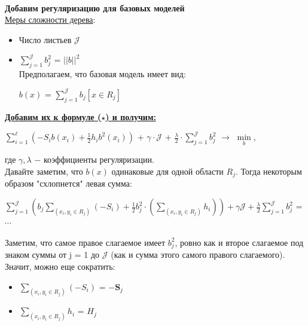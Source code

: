         \\

        
        \textbf{Добавим регуляризацию для базовых моделей}\\

        \underline{Меры сложности дерева}:
        \begin{itemize}
            \item Число листьев $\mathcal{J}$

            \item $\sum\limits_{j = 1}^\mathcal{J}b_j^2$ = $||b||^2$\\

                Предполагаем, что базовая модель имеет вид:
                \begin{center}
                \large
                    $b(x)$ = $\sum\limits_{j = 1}^\mathcal{J}b_j[x \in R_j]$
                \end{center}
        \end{itemize}

        \underline{\textbf{Добавим их к формуле ($\star$) и получим:}} 
        \begin{center}
        \Large
            $\sum\limits_{i = 1}^\ell (-S_ib(x_i) + \frac{1}{2}h_ib^2(x_i))$ + $\gamma \cdot \mathcal{J}$ + $\frac{\lambda}{2} \cdot \sum\limits_{j = 1}^\mathcal{J}b_j^2$ $\longrightarrow$ $\min\limits_{b}$,
        \end{center}
        где $\gamma, \lambda$ $-$ коэффициенты регуляризации.\\

        Давайте заметим, что $b(x)$ одинаковые для одной области $R_j$. Тогда некоторым образом "схлопнется" левая сумма:
        \begin{center}
        \large
            $\sum\limits_{j = 1}^\mathcal{J} (b_j \sum\limits_{(x_i, y_i \in R_j)}(-S_i) + \frac{1}{2}b_j^2\cdot(\sum\limits_{(x_i, y_i \in R_j)}h_i)) + \gamma\mathcal{J} + \frac{\lambda}{2}\sum\limits_{j = 1}^\mathcal{J}b_j^2$ = $\cdots$
        \end{center}

        Заметим, что самое правое слагаемое имеет $b_j^2$, ровно как и второе слагаемое под знаком суммы от j = 1 до $\mathcal{J}$ (как и сумма этого самого правого слагаемого). Значит, можно еще сократить:\\
        \begin{itemize}
            \item $\sum\limits_{(x_i, y_i \in R_j)}(-S_i)$ = $-\mathbf{S}_j$

            \item $\sum\limits_{(x_i, y_i \in R_j)}h_i$ = $H_j$
        \end{itemize}

